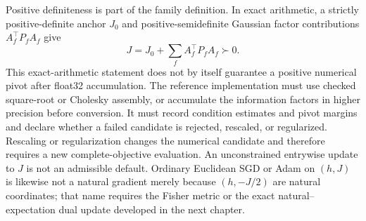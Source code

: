 Positive definiteness is part of the family definition. In exact arithmetic, a strictly positive-definite anchor $J_0$ and positive-semidefinite Gaussian factor contributions $A_f^\top P_fA_f$ give
\begin{equation}
J=J_0+\sum_f A_f^\top P_fA_f\succ0.
\label{eq:exact-spd-factor-assembly}
\end{equation}
This exact-arithmetic statement does not by itself guarantee a positive numerical pivot after float32 accumulation. The reference implementation must use checked square-root or Cholesky assembly, or accumulate the information factors in higher precision before conversion. It must record condition estimates and pivot margins and declare whether a failed candidate is rejected, rescaled, or regularized. Rescaling or regularization changes the numerical candidate and therefore requires a new complete-objective evaluation. An unconstrained entrywise update to $J$ is not an admissible default. Ordinary Euclidean SGD or Adam on $(h,J)$ is likewise not a natural gradient merely because $(h,-J/2)$ are natural coordinates; that name requires the Fisher metric or the exact natural--expectation dual update developed in the next chapter.
